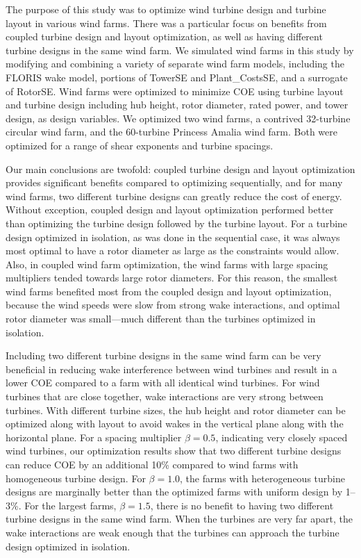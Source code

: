 The purpose of this study was to optimize wind turbine design and turbine layout in various wind farms. There was a particular focus on benefits from coupled turbine design and layout optimization, as well as having different turbine designs in the same wind farm. We simulated wind farms in this study by modifying and combining a variety of separate wind farm models, including the FLORIS wake model, portions of TowerSE and Plant\_CostsSE, and a surrogate of RotorSE. Wind farms were optimized to minimize COE using turbine layout and turbine design including hub height, rotor diameter, rated power, and tower design, as design variables. We optimized two wind farms, a contrived 32-turbine circular wind farm, and the 60-turbine Princess Amalia wind farm. Both were optimized for a range of shear exponents and turbine spacings. 

Our main conclusions are twofold: coupled turbine design and layout optimization provides significant benefits compared to optimizing sequentially, and for many wind farms, two different turbine designs can greatly reduce the cost of energy. Without exception, coupled design and layout optimization performed better than optimizing the turbine design followed by the turbine layout. For a turbine design optimized in isolation, as was done in the sequential case, it was always most optimal to have a rotor diameter as large as the constraints would allow. Also, in coupled wind farm optimization, the wind farms with large spacing multipliers tended towards large rotor diameters. For this reason, the smallest wind farms benefited most from the coupled design and layout optimization, because the wind speeds were slow from strong wake interactions, and optimal rotor diameter was small---much different than the turbines optimized in isolation.

Including two different turbine designs in the same wind farm can be very beneficial in reducing wake interference between wind turbines and result in a lower COE compared to a farm with all identical wind turbines. For wind turbines that are close together, wake interactions are very strong between turbines. With different turbine sizes, the hub height and rotor diameter can be optimized along with layout to avoid wakes in the vertical plane along with the horizontal plane. For a spacing multiplier $\beta=0.5$, indicating very closely spaced wind turbines, our optimization results show that two different turbine designs can reduce COE by an additional 10\% compared to wind farms with homogeneous turbine design. For $\beta=1.0$, the farms with heterogeneous turbine designs are marginally better than the optimized farms with uniform design by 1--3\%. For the largest farms, $\beta=1.5$, there is no benefit to having two different turbine designs in the same wind farm. When the turbines are very far apart, the wake interactions are weak enough that the turbines can approach the turbine design optimized in isolation. 

